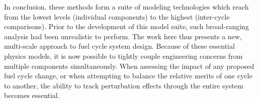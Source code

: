 In conclusion, these methods form a suite of modeling technologies which reach from the lowest levels
(individual components) to the highest (inter-cycle comparisons).
Prior to the development of this model suite, such broad-ranging analysis had been unrealistic to perform.
The work here thus presents a new, multi-scale approach to fuel cycle system design.  
Because of these essential physics models, it is now possible to tightly couple engineering 
concerns from multiple components simultaneously.  When assessing the impact of any 
proposed fuel cycle change, or when attempting to balance the relative merits of one 
cycle to another, the ability to track perturbation effects through the entire system becomes
essential.
